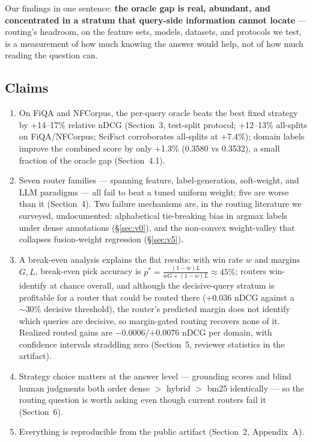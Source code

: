 \documentclass[11pt]{article}
\begin{document}
Our findings in one sentence: \textbf{the oracle gap is real, abundant, and concentrated in a stratum that query-side information cannot locate} --- routing's headroom, on the feature sets, models, datasets, and protocols we test, is a measurement of how much knowing the answer would help, not of how much reading the question can.

\subsection{Claims}
\begin{enumerate}
\item On FiQA and NFCorpus, the per-query oracle beats the best fixed strategy by +14--17\% relative nDCG (Section~3, test-split protocol; +12--13\% all-splits on FiQA/NFCorpus; SciFact corroborates all-splits at +7.4\%); domain labels improve the combined score by only +1.3\% (0.3580 vs 0.3532), a small fraction of the oracle gap (Section~4.1).
\item Seven router families --- spanning feature, label-generation, soft-weight, and LLM paradigms --- all fail to beat a tuned uniform weight; five are worse than it (Section~4). Two failure mechanisms are, in the routing literature we surveyed, undocumented: alphabetical tie-breaking bias in argmax labels under dense annotations (\S\ref{sec:v0}), and the non-convex weight-valley that collapses fusion-weight regression (\S\ref{sec:v5}).
\item A break-even analysis explains the flat results: with win rate $w$ and margins $G, L$, break-even pick accuracy is $p^* = \frac{(1-w)L}{wG+(1-w)L} \approx 45\%$; routers win-identify at chance overall, and although the decisive-query stratum is profitable for a router that could be routed there ($+0.036$ nDCG against a ${\sim}30\%$ decisive threshold), the router's predicted margin does not identify which queries are decisive, so margin-gated routing recovers none of it. Realized routed gains are $-0.0006$/$+0.0076$ nDCG per domain, with confidence intervals straddling zero (Section~5, reviewer statistics in the artifact).
\item Strategy choice matters at the answer level --- grounding scores and blind human judgments both order dense $>$ hybrid $>$ bm25 identically --- so the routing question is worth asking even though current routers fail it (Section~6).
\item Everything is reproducible from the public artifact (Section~2, Appendix~A).
\end{enumerate}
\end{document}
